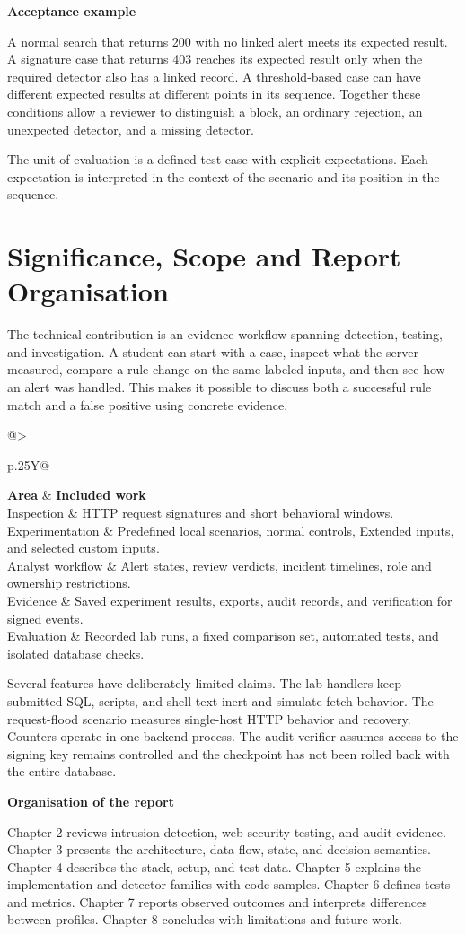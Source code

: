 \documentclass[11pt,a4paper,oneside]{report}
\makeatletter
\newcommand{\topic}[1]{\smallskip\noindent\textbf{#1}\par\nobreak\vspace{-.39em}}
\newcommand{\sheet}[1]{\clearpage\section{#1}}
\newcommand{\tabletitle}[1]{\captionof{table}{#1}\smallskip}
\newcommand{\bodytable}[1]{\begin{tabularx}{\linewidth}{@{}>{\raggedright\arraybackslash}p{.25\linewidth}Y@{}}\toprule #1\bottomrule\end{tabularx}}
\newcommand{\callout}[1]{\noindent\colorbox{papergray}{\parbox{\dimexpr\linewidth-2\fboxsep\relax}{\small\strut #1\strut}}}
\makeatother
\begin{document}
\topic{Acceptance example}
A normal search that returns 200 with no linked alert meets its expected result. A signature case that returns 403 reaches its expected result only when the required detector also has a linked record. A threshold-based case can have different expected results at different points in its sequence. Together these conditions allow a reviewer to distinguish a block, an ordinary rejection, an unexpected detector, and a missing detector.

\callout{The unit of evaluation is a defined test case with explicit expectations. Each expectation is interpreted in the context of the scenario and its position in the sequence.}

\sheet{Significance, Scope and Report Organisation}
The technical contribution is an evidence workflow spanning detection, testing, and investigation. A student can start with a case, inspect what the server measured, compare a rule change on the same labeled inputs, and then see how an alert was handled. This makes it possible to discuss both a successful rule match and a false positive using concrete evidence.

\tabletitle{Scope of the project}
\bodytable{\textbf{Area} & \textbf{Included work}\\\midrule
Inspection & HTTP request signatures and short behavioral windows.\\
Experimentation & Predefined local scenarios, normal controls, Extended inputs, and selected custom inputs.\\
Analyst workflow & Alert states, review verdicts, incident timelines, role and ownership restrictions.\\
Evidence & Saved experiment results, exports, audit records, and verification for signed events.\\
Evaluation & Recorded lab runs, a fixed comparison set, automated tests, and isolated database checks.\\}
\par

Several features have deliberately limited claims. The lab handlers keep submitted SQL, scripts, and shell text inert and simulate fetch behavior. The request-flood scenario measures single-host HTTP behavior and recovery. Counters operate in one backend process. The audit verifier assumes access to the signing key remains controlled and the checkpoint has not been rolled back with the entire database.

\topic{Organisation of the report}
Chapter 2 reviews intrusion detection, web security testing, and audit evidence. Chapter 3 presents the architecture, data flow, state, and decision semantics. Chapter 4 describes the stack, setup, and test data. Chapter 5 explains the implementation and detector families with code samples. Chapter 6 defines tests and metrics. Chapter 7 reports observed outcomes and interprets differences between profiles. Chapter 8 concludes with limitations and future work.
\end{document}

